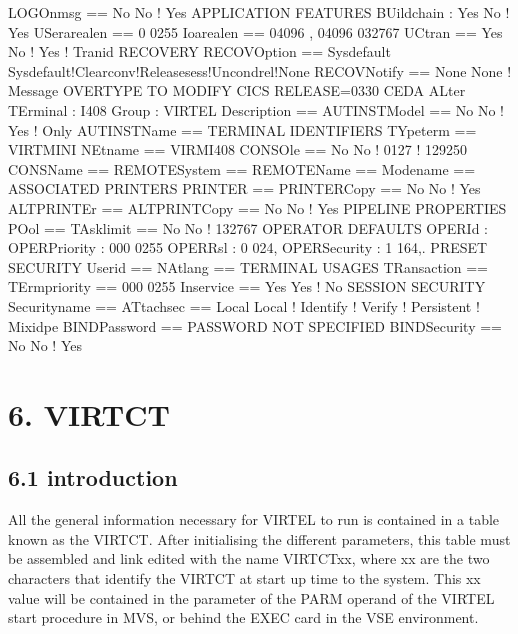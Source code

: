 \documentclass[letterpaper,10pt,english]{sphinxmanual}
\begin{document}
\begin{sphinxVerbatim}[commandchars=\\\{\}]
LOGOnmsg ==\PYGZgt{} No       No ! Yes
APPLICATION FEATURES
BUildchain : Yes      No ! Yes
USerarealen ==\PYGZgt{} 0     0\PYGZhy{}255
Ioarealen ==\PYGZgt{} 04096 , 04096 0\PYGZhy{}32767
UCtran ==\PYGZgt{} Yes        No ! Yes ! Tranid
RECOVERY
RECOVOption ==\PYGZgt{} Sysdefault Sysdefault!Clearconv!Releasesess!Uncondrel!None
RECOVNotify ==\PYGZgt{} None  None ! Message
OVERTYPE TO MODIFY CICS RELEASE=0330
CEDA ALter
TErminal : I408
Group : VIRTEL
Description ==\PYGZgt{}
AUTINSTModel ==\PYGZgt{} No   No ! Yes ! Only
AUTINSTName ==\PYGZgt{}
TERMINAL IDENTIFIERS
TYpeterm ==\PYGZgt{} VIRTMINI
NEtname ==\PYGZgt{} VIRMI408
CONSOle ==\PYGZgt{} No        No ! 0\PYGZhy{}127 ! 129\PYGZhy{}250
CONSName ==\PYGZgt{}
REMOTESystem ==\PYGZgt{}
REMOTEName ==\PYGZgt{}
Modename ==\PYGZgt{}
ASSOCIATED PRINTERS
PRINTER ==\PYGZgt{}
PRINTERCopy ==\PYGZgt{} No    No ! Yes
ALTPRINTEr ==\PYGZgt{}
ALTPRINTCopy ==\PYGZgt{} No   No ! Yes
PIPELINE PROPERTIES
POol ==\PYGZgt{}
TAsklimit ==\PYGZgt{} No      No ! 1\PYGZhy{}32767
OPERATOR DEFAULTS
OPERId :
OPERPriority : 000    0\PYGZhy{}255
OPERRsl : 0           0\PYGZhy{}24,
OPERSecurity : 1      1\PYGZhy{}64,.
PRESET SECURITY
Userid ==\PYGZgt{}
NAtlang ==\PYGZgt{}
TERMINAL USAGES
TRansaction ==\PYGZgt{}
TErmpriority ==\PYGZgt{} 000  0\PYGZhy{}255
Inservice ==\PYGZgt{} Yes     Yes ! No
SESSION SECURITY
Securityname ==\PYGZgt{}
ATtachsec ==\PYGZgt{} Local   Local ! Identify ! Verify ! Persistent ! Mixidpe
BINDPassword ==\PYGZgt{} PASSWORD NOT SPECIFIED
BINDSecurity ==\PYGZgt{} No   No ! Yes
\end{sphinxVerbatim}



\chapter{6. VIRTCT}
\label{\detokenize{Installation_Guide:virtct}}\label{\detokenize{Installation_Guide:v457ig-bookmark01}}

\section{6.1 introduction}
\label{\detokenize{Installation_Guide:id6}}
All the general information necessary for VIRTEL to run is contained in a table known as the VIRTCT. After initialising the different  parameters, this table must be assembled and link edited with the name VIRTCTxx, where xx are the two characters that identify the     VIRTCT at start up time to the system. This xx value will be contained in the parameter of the PARM operand of the VIRTEL start procedure in MVS, or behind the EXEC card in the VSE environment.
\end{document}
